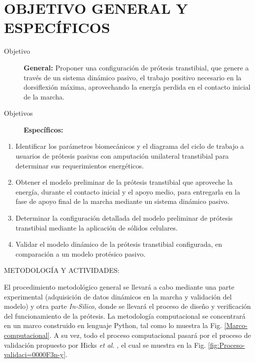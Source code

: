 \documentclass[12pt,english]{article}
\begin{document}
\section*{OBJETIVO GENERAL Y ESPECÍFICOS}
\begin{description}
\item [{Objetivo}] \textbf{General:} Proponer una configuración de prótesis
transtibial, que genere a través de un sistema dinámico pasivo, el
trabajo positivo necesario en la dorsiflexión máxima, aprovechando
la energía perdida en el contacto inicial de la marcha.
\item [{Objetivos}] \textbf{Específicos:}\end{description}
\begin{enumerate}
\item Identificar los parámetros biomecánicos y el diagrama del ciclo de
trabajo a usuarios de prótesis pasivas con amputación unilateral
transtibial para determinar sus requerimientos energéticos.
\item Obtener el modelo preliminar de la prótesis transtibial que
aproveche la energía, durante el contacto inicial y el apoyo medio,
para entregarla en la fase de apoyo final de la marcha mediante un
sistema dinámico pasivo.
\item Determinar la configuración detallada del modelo preliminar de prótesis transtibial mediante la aplicación de sólidos celulares.
\item Validar el modelo dinámico de la prótesis transtibial configurada,
en comparación a un modelo protésico pasivo.\end{enumerate}
\begin{description}
\item [{METODOLOGÍA Y ACTIVIDADES:}]
\end{description}
El procedimiento metodológico general se llevará a cabo mediante una parte experimental (adquisición de datos dinámicos en la marcha y validación del modelo) y otra parte \emph{In-Silico}, donde se llevará el proceso de diseño y verificación del funcionamiento de la prótesis. La metodología computacional se concentrará en un marco construido en lenguaje Python, tal como lo muestra la Fig. \ref{Marco-computacional}. A su vez, todo el proceso computacional pasará por el proceso de validación propuesto por Hicks \emph{et al.} \cite{Hicks2014}, el cual se muestra en la Fig. \ref{fig:Proceso-validaci=0000F3n-y}.
\end{document}
